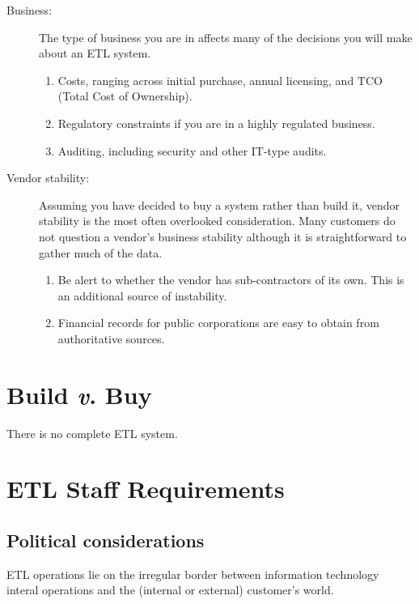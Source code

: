 \documentclass[11pt,letterpaper,twosided]{memoir}
\begin{document}
\begin{description}
\item[Business:] The type of business you are in affects many of
the decisions you will make about an ETL system.

\begin{enumerate}
\item Costs, ranging across initial purchase, annual licensing, and
TCO (Total Cost of Ownership).
\item Regulatory constraints if you are in a highly regulated business.
\item Auditing, including security and other IT-type audits.
\end{enumerate}

\item[Vendor stability:] Assuming you have decided to buy a system
rather than build it, vendor stability is the most often overlooked 
consideration. Many customers do not question a vendor's business stability
although it is straightforward to gather much of the data.

\begin{enumerate}
\item Be alert to whether the vendor has sub-contractors of its own.
This is an additional source of instability.

\item Financial records for public corporations are easy to obtain
from authoritative sources. 
\end{enumerate}
\end{description}


\chapter{Build \emph{v}. Buy}

There is no complete ETL system.

\chapter{ETL Staff Requirements}
\label{chap:staffing}

\section{Political considerations}

ETL operations lie on the irregular border between information 
technology interal operations and the (internal or external) 
customer's world. 
\end{document}
